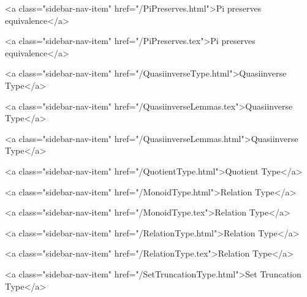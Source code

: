       
        
          <a class="sidebar-nav-item" href="/PiPreserves.html">Pi preserves equivalence</a>
        
      
    
      
        
          <a class="sidebar-nav-item" href="/PiPreserves.tex">Pi preserves equivalence</a>
        
      
    
      
        
          <a class="sidebar-nav-item" href="/QuasiinverseType.html">Quasiinverse Type</a>
        
      
    
      
        
          <a class="sidebar-nav-item" href="/QuasiinverseLemmas.tex">Quasiinverse Type</a>
        
      
    
      
        
          <a class="sidebar-nav-item" href="/QuasiinverseLemmas.html">Quasiinverse Type</a>
        
      
    
      
        
          <a class="sidebar-nav-item" href="/QuotientType.html">Quotient Type</a>
        
      
    
      
        
          <a class="sidebar-nav-item" href="/MonoidType.html">Relation Type</a>
        
      
    
      
        
          <a class="sidebar-nav-item" href="/MonoidType.tex">Relation Type</a>
        
      
    
      
        
          <a class="sidebar-nav-item" href="/RelationType.html">Relation Type</a>
        
      
    
      
        
          <a class="sidebar-nav-item" href="/RelationType.tex">Relation Type</a>
        
      
    
      
        
          <a class="sidebar-nav-item" href="/SetTruncationType.html">Set Truncation Type</a>
        

